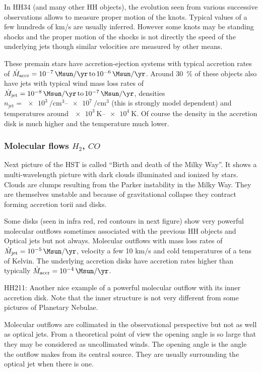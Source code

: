\documentclass[10pt,a4paper,english]{article}
\newcommand\SIrangeto[2]{\SIrange[range-phrase=\,\text{to}\,]{#1}{#2}}
\begin{document}
In HH34 (and many other HH objects), the evolution seen from various successive
observations allows to measure proper motion of the knots. Typical values of a
few hundreds of km/s are usually inferred. However some knots may be standing
shocks and the proper motion of the shocks is not directly the speed of the
underlying jets though similar velocities are measured by other means.

These premain stars have accretion-ejection systems with typical accretion
rates of $\dot{M}_\mathrm{accr}=\SIrangeto{e-7}{e-6}{\Msun\per\yr}$. Around
\SI{30}{\percent} of these objects also have jets with typical wind mass loss
rates of $\dot{M}_\mathrm{jet}=\SIrangeto{e-8}{e-7}{\Msun\per\yr}$, densities
$n_\mathrm{jet}=\SIrangeto{e3}{e7}{\per\cubic\cm}$ (this is strongly model
dependent) and temperatures around $\SIrangeto{e3}{e4}{\kelvin}$. Of course the
density in the accretion disk is much higher and the temperature much lower.

\subsubsection{\texorpdfstring{Molecular flows $H_2$, $CO$}{Molecular flows H2, CO}}

Next picture of the HST is called “Birth and death of the Milky Way”. It shows
a multi-wavelength picture with dark clouds illuminated and ionized by stars.
Clouds are clumps resulting from the Parker  instability in the
Milky Way. They are themselves unstable and because of gravitational collapse
they contract forming accretion torii and disks.

Some disks (seen in infra red, red contours in next figure) show very powerful
molecular outflows sometimes associated with the previous HH objects and
Optical jets but not always. Molecular outflows with mass loss rates of
$\dot{M}_\mathrm{jet}=\SI{e-5}{\Msun\per\yr}$, velocity a few 10 km/s and cold
temperatures of a tens of Kelvin. The underlying accretion disks have accretion
rates higher than typically $\dot{M}_\mathrm{accr}=\SI{e-4}{\Msun\per\yr}$.

HH211: Another nice example of a powerful molecular outflow with its inner
accretion disk. Note that the inner structure is not very different from some
pictures of Planetary Nebulae.

Molecular outflows are collimated in the observational perspective but not as
well as optical jets. From a theoretical point of view the opening angle is so
large that they may be considered as uncollimated winds. The opening angle is
the angle the outflow makes from its central source. They are usually
surrounding the optical jet when there is one.
\end{document}
